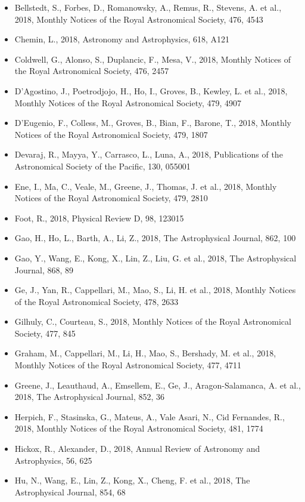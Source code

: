 \documentclass{letter}
\begin{document}
\begin{enumerate}
\begin{itemize}
\item Bellstedt, S., Forbes, D., Romanowsky, A., Remus, R., Stevens, A. et al., 2018, Monthly Notices of the Royal Astronomical Society, 476, 4543
\item Chemin, L., 2018, Astronomy and Astrophysics, 618, A121
\item Coldwell, G., Alonso, S., Duplancic, F., Mesa, V., 2018, Monthly Notices of the Royal Astronomical Society, 476, 2457
\item D'Agostino, J., Poetrodjojo, H., Ho, I., Groves, B., Kewley, L. et al., 2018, Monthly Notices of the Royal Astronomical Society, 479, 4907
\item D'Eugenio, F., Colless, M., Groves, B., Bian, F., Barone, T., 2018, Monthly Notices of the Royal Astronomical Society, 479, 1807
\item Devaraj, R., Mayya, Y., Carrasco, L., Luna, A., 2018, Publications of the Astronomical Society of the Pacific, 130, 055001
\item Ene, I., Ma, C., Veale, M., Greene, J., Thomas, J. et al., 2018, Monthly Notices of the Royal Astronomical Society, 479, 2810
\item Foot, R., 2018, Physical Review D, 98, 123015
\item Gao, H., Ho, L., Barth, A., Li, Z., 2018, The Astrophysical Journal, 862, 100
\item Gao, Y., Wang, E., Kong, X., Lin, Z., Liu, G. et al., 2018, The Astrophysical Journal, 868, 89
\item Ge, J., Yan, R., Cappellari, M., Mao, S., Li, H. et al., 2018, Monthly Notices of the Royal Astronomical Society, 478, 2633
\item Gilhuly, C., Courteau, S., 2018, Monthly Notices of the Royal Astronomical Society, 477, 845
\item Graham, M., Cappellari, M., Li, H., Mao, S., Bershady, M. et al., 2018, Monthly Notices of the Royal Astronomical Society, 477, 4711
\item Greene, J., Leauthaud, A., Emsellem, E., Ge, J., Aragon-Salamanca, A. et al., 2018, The Astrophysical Journal, 852, 36
\item Herpich, F., Stasinska, G., Mateus, A., Vale Asari, N., Cid Fernandes, R., 2018, Monthly Notices of the Royal Astronomical Society, 481, 1774
\item Hickox, R., Alexander, D., 2018, Annual Review of Astronomy and Astrophysics, 56, 625
\item Hu, N., Wang, E., Lin, Z., Kong, X., Cheng, F. et al., 2018, The Astrophysical Journal, 854, 68

\end{itemize}
\end{enumerate}
\end{document}

